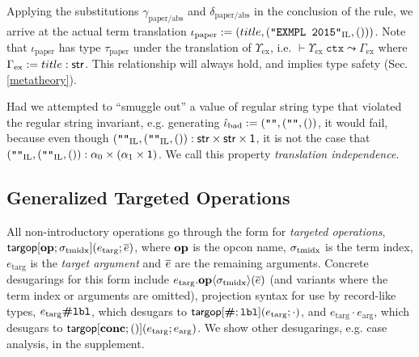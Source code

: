\documentclass[preprint]{sigplanconf}
\begin{document}
Applying the substitutions $\gamma_\text{paper/abs}$ and $\delta_\text{paper/abs}$ in the conclusion of the rule, we arrive at the actual term translation $\iota_\text{paper} := (title, (\texttt{"EXMPL 2015"}_\text{IL}, ()))$. Note that $\iota_\text{paper}$ has type $\tau_\text{paper}$ under the translation of $\Upsilon_\text{ex}$, i.e. $\vdash \Upsilon_\text{ex}~\mathtt{ctx} \leadsto \Gamma_\text{ex}$ where $\Gamma_\text{ex} := title : {\sf str}$. This relationship will always hold, and implies type safety (Sec. \ref{metatheory}). 

Had we attempted to ``smuggle out'' a value of regular string type that violated the regular string invariant, e.g. generating $\hat{\iota}_\text{bad} := (\texttt{""}, (\texttt{""}, ())$, it would fail, because even though $(\texttt{""}_\text{IL}, (\texttt{""}_\text{IL}, ()) : {\sf str} \times {\sf str} \times {\sf 1}$, it is not the case that $(\texttt{""}_\text{IL}, (\texttt{""}_\text{IL}, ()) : \alpha_0 \times (\alpha_1 \times {\sf 1})$. We call this property \emph{translation independence}.


\subsection{Generalized Targeted Operations} \label{sec:targops}
\noindent All non-introductory operations go through the form for \emph{targeted operations}, ${\sf targop}[\textbf{op}; \sigma_\text{tmidx}](e_\text{targ}; \overline{e})$, where $\textbf{op}$ is the opcon name, ${\sigma_\text{tmidx}}$ is the term index, $e_\text{targ}$ is the \emph{target argument} and $\overline{e}$ are the remaining arguments. Concrete desugarings for this form include $e_\text{targ}.\textbf{op}\langle\sigma_\text{tmidx}\rangle(\overline{e})$ (and variants where the term index or arguments are omitted), projection syntax for use by record-like types, $e_\text{targ}\textbf{\#}\texttt{lbl}$, which desugars to ${\sf targop}[\textbf{\#}; \texttt{lbl}](e_\text{targ}; \cdot)$, and $e_\text{targ} \cdot e_\text{arg}$, which desugars to ${\sf targop}[\textbf{conc}; ()](e_\text{targ}; e_\text{arg})$. We show other desugarings, e.g. case analysis, in the supplement.
\end{document}
